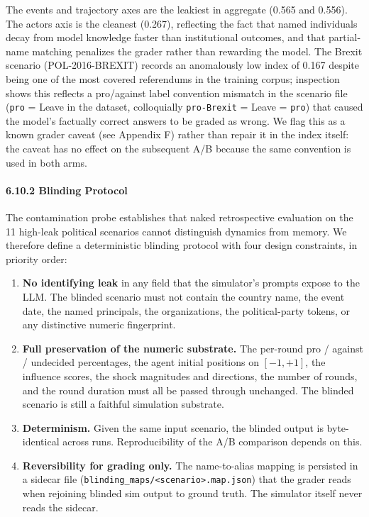 \documentclass[
]{article}
\providecommand{\tightlist}{%
  \setlength{\itemsep}{0pt}\setlength{\parskip}{0pt}}
\begin{document}
The events and trajectory axes are the leakiest in aggregate (0.565 and
0.556). The actors axis is the cleanest (0.267), reflecting the fact
that named individuals decay from model knowledge faster than
institutional outcomes, and that partial-name matching penalizes the
grader rather than rewarding the model. The Brexit scenario
(POL-2016-BREXIT) records an anomalously low index of 0.167 despite
being one of the most covered referendums in the training corpus;
inspection shows this reflects a pro/against label convention mismatch
in the scenario file (\texttt{pro} = Leave in the dataset, colloquially
\texttt{pro-Brexit} = Leave = \texttt{pro}) that caused the model's
factually correct answers to be graded as wrong. We flag this as a known
grader caveat (see Appendix F) rather than repair it in the index
itself: the caveat has no effect on the subsequent A/B because the same
convention is used in both arms.

\paragraph{6.10.2 Blinding Protocol}\label{blinding-protocol}

The contamination probe establishes that naked retrospective evaluation
on the 11 high-leak political scenarios cannot distinguish dynamics from
memory. We therefore define a deterministic blinding protocol with four
design constraints, in priority order:

\begin{enumerate}
\def\labelenumi{\arabic{enumi}.}
\tightlist
\item
  \textbf{No identifying leak} in any field that the simulator's prompts
  expose to the LLM. The blinded scenario must not contain the country
  name, the event date, the named principals, the organizations, the
  political-party tokens, or any distinctive numeric fingerprint.
\item
  \textbf{Full preservation of the numeric substrate.} The per-round pro
  / against / undecided percentages, the agent initial positions on
  \([-1, +1]\), the influence scores, the shock magnitudes and
  directions, the number of rounds, and the round duration must all be
  passed through unchanged. The blinded scenario is still a faithful
  simulation substrate.
\item
  \textbf{Determinism.} Given the same input scenario, the blinded
  output is byte-identical across runs. Reproducibility of the A/B
  comparison depends on this.
\item
  \textbf{Reversibility for grading only.} The name-to-alias mapping is
  persisted in a sidecar file
  (\texttt{blinding\_maps/\textless{}scenario\textgreater{}.map.json})
  that the grader reads when rejoining blinded sim output to ground
  truth. The simulator itself never reads the sidecar.
\end{enumerate}
\end{document}
